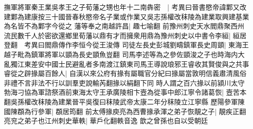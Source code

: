 撫軍將軍秦王業吳孝王之子荀藩之甥也年十二南犇密　|{
	考異曰晉書愍帝諱鄴又改建鄴為建康按三十國晉春秋愍帝名子業或作業又吳志孫權改秣陵為建業取興建基業為名皆不為鄴字今從之}
藩等奉之南越許昌|{
	趣七喻翻}
前豫州刺史天水閻鼎聚西州流民數千人於密欲還鄉里荀藩以鼎有才而擁衆用鼎為豫州刺史以中書令李絙|{
	絙居登翻　考異曰閻鼎傳作李恒今從王浚傳}
司徒左長史彭城劉疇鎮軍長史周顗|{
	東海王越子毗為鎮軍將軍以顗為長史顗魚豈翻}
司馬李述等為之參佐顗浚之子也時海内大亂獨江東差安中國士民避亂者多南渡江鎮東司馬王導說琅邪王睿收其賢俊與之共事睿從之辟掾屬百餘人|{
	自漢以來公府有掾有屬職官分紀曰掾屬當敦明信義肅清風俗非禮不言非法不行以訓羣吏說輸芮翻掾以絹翻下同}
時人謂之百六掾以前潁川太守勃海刁協為軍諮祭酒前東海太守王承廣陵相卞壼為從事中郎江寧令諸葛恢|{
	壼苦本翻吳孫權改秣陵為建業晉平吳復曰秣陵武帝太康二年分秣陵立江寧縣}
歷陽參軍陳國陳頵為行參軍|{
	頵居筠翻}
前太傅掾庾亮為西曹掾承渾之弟子恢靚之子|{
	靚疾正翻}
亮兖之弟子也江州刺史華軼|{
	華戶化翻軼音逸}
歆之曾孫也自以受朝廷

